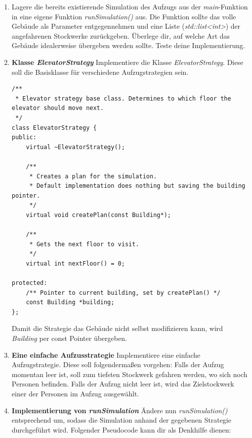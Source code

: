\begin{enumerate}
\item
Lagere die bereits existierende Simulation des Aufzugs aus der \emph{main}-Funktion in eine eigene Funktion \emph{runSimulation()} aus. Die Funktion sollte das volle Gebäude als Parameter entgegennehmen und eine Liste (\emph{std::list<int>}) der angefahrenen Stockwerke zurückgeben. Überlege dir, auf welche Art das Gebäude idealerweise übergeben werden sollte.
Teste deine Implementierung.

\item \textbf{Klasse \emph{ElevatorStrategy}}
Implementiere die Klasse \emph{ElevatorStrategy}.
Diese soll die Basisklasse für verschiedene Aufzugstrategien sein.

\begin{lstlisting}
/**
 * Elevator strategy base class. Determines to which floor the elevator should move next.
 */
class ElevatorStrategy {
public:
	virtual ~ElevatorStrategy();

	/**
	 * Creates a plan for the simulation. 
	 * Default implementation does nothing but saving the building pointer.
	 */
	virtual void createPlan(const Building*);

	/** 
	 * Gets the next floor to visit.
	 */
	virtual int nextFloor() = 0;

protected:
	/** Pointer to current building, set by createPlan() */
	const Building *building;
};
\end{lstlisting}

Damit die Strategie das Gebäude nicht selbst modifizieren kann, wird \emph{Building} per const Pointer übergeben.

\item \textbf{Eine einfache Aufzusstrategie}
Implementiere eine einfache Aufzugstrategie.
Diese soll folgendermaßen vorgehen: 
Falls der Aufzug momentan leer ist, soll zum tiefsten Stockwerk gefahren werden, wo sich noch Personen befinden.
Falls der Aufzug nicht leer ist, wird das Zielstockwerk einer der Personen im Aufzug ausgewählt.

\item \textbf{Implementierung von \emph{runSimulation}}
Ändere nun \emph{runSimulation()} entsprechend um, sodass die Simulation anhand der gegebenen Strategie durchgeführt wird.
Folgender Pseudocode kann dir als Denkhilfe dienen: \\
\begin{algorithm}[H]
 \SetAlgoLined
\end{algorithm}
\end{enumerate}
